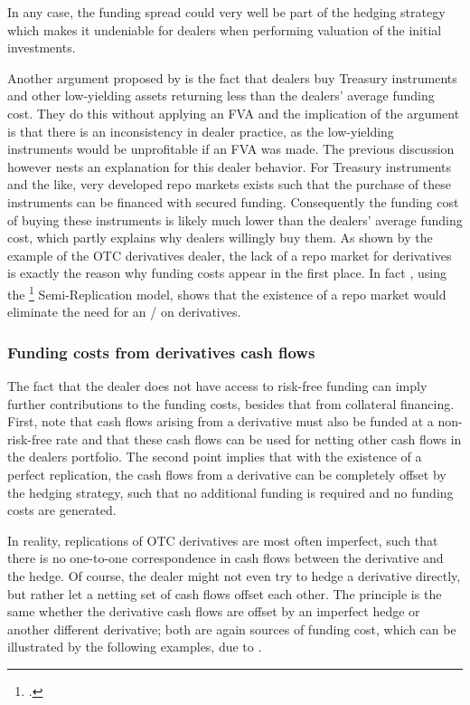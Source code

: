 \documentclass[../../../main.tex]{subfiles}
\begin{document}
        In any case,
        the funding spread could very well be part of the hedging strategy which makes it undeniable for dealers when performing valuation of the initial investments.

        Another argument proposed by \cite{HullWhite2012FVA} is the fact that dealers buy Treasury instruments and other low-yielding assets returning less than the dealers' average funding cost.
        They do this without applying an FVA and the implication of the argument is that there is an inconsistency in dealer practice,
        as the low-yielding instruments would be unprofitable if an FVA was made.
        The previous discussion however nests an explanation for this dealer behavior.
        For Treasury instruments and the like,
        very developed repo markets exists such that the purchase of these instruments can be financed with secured funding.
        Consequently the funding cost of buying these instruments is likely much lower than the dealers' average funding cost,
        which partly explains why dealers willingly buy them.
        As shown by the example of the OTC derivatives dealer, 
        the lack of a repo market for derivatives is exactly the reason why funding costs appear in the first place.
        In fact \cite[Section~9.4.1]{Green2015XVA}, 
        using the \footcite{BurgardKjaer2013Funding} Semi-Replication model,
        shows that the existence of a repo market would eliminate the need for an \FVA/ on derivatives. 
        
    \subsubsection{Funding costs from derivatives cash flows}
        The fact that the dealer does not have access to risk-free funding
        can imply further contributions to the funding costs, besides that from collateral financing.
        First, note that cash flows arising from a derivative must also be funded at a non-risk-free rate
        and that these cash flows can be used for netting other cash flows in the dealers portfolio.
        The second point implies that with the existence of a perfect replication,
        the cash flows from a derivative can be completely offset by the hedging strategy,
        such that no additional funding is required and no funding costs are generated.

        In reality, replications of OTC derivatives are most often imperfect,
        such that there is no one-to-one correspondence in cash flows between the derivative and the hedge.
        Of course, the dealer might not even try to hedge a derivative directly,
        but rather let a netting set of cash flows offset each other. 
        The principle is the same whether the derivative cash flows are offset by an imperfect hedge
        or another different derivative;
        both are again sources of funding cost, which can be illustrated by the following examples,
        due to \cite[Section~12.3]{Ruiz2015XVA}.
\end{document}

